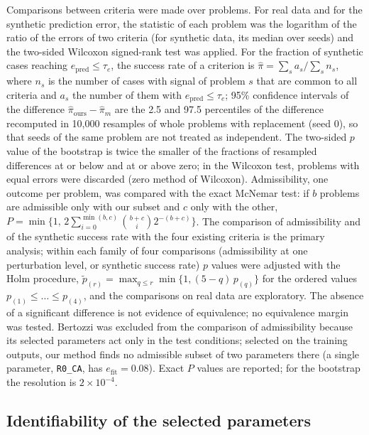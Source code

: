 \documentclass[pdflatex,sn-nature]{sn-jnl}
\theoremstyle{plain}
\begin{document}
Comparisons between criteria were made over problems. For real data and for the synthetic prediction error, the statistic of each problem was the logarithm of the ratio of the errors of two criteria (for synthetic data, its median over seeds) and the two-sided Wilcoxon signed-rank test was applied. For the fraction of synthetic cases reaching $e_{\mathrm{pred}}\le\tau_e$, the success rate of a criterion is $\hat\pi=\sum_s a_s/\sum_s n_s$, where $n_s$ is the number of cases with signal of problem $s$ that are common to all criteria and $a_s$ the number of them with $e_{\mathrm{pred}}\le\tau_e$; 95\% confidence intervals of the difference $\hat\pi_{\mathrm{ours}}-\hat\pi_m$ are the 2.5 and 97.5 percentiles of the difference recomputed in 10,000 resamples of whole problems with replacement (seed 0), so that seeds of the same problem are not treated as independent. The two-sided $p$ value of the bootstrap is twice the smaller of the fractions of resampled differences at or below and at or above zero; in the Wilcoxon test, problems with equal errors were discarded (zero method of Wilcoxon). Admissibility, one outcome per problem, was compared with the exact McNemar test: if $b$ problems are admissible only with our subset and $c$ only with the other, $P=\min\{1,\,2\sum_{i=0}^{\min(b,c)}\binom{b+c}{i}2^{-(b+c)}\}$. The comparison of admissibility and of the synthetic success rate with the four existing criteria is the primary analysis; within each family of four comparisons (admissibility at one perturbation level, or synthetic success rate) $p$ values were adjusted with the Holm procedure, $\tilde p_{(r)}=\max_{q\le r}\min\{1,(5-q)\,p_{(q)}\}$ for the ordered values $p_{(1)}\le\dots\le p_{(4)}$, and the comparisons on real data are exploratory. The absence of a significant difference is not evidence of equivalence; no equivalence margin was tested. Bertozzi was excluded from the comparison of admissibility because its selected parameters act only in the test conditions; selected on the training outputs, our method finds no admissible subset of two parameters there (a single parameter, \texttt{R0\_CA}, has $e_{\mathrm{fit}}=0.08$). Exact $P$ values are reported; for the bootstrap the resolution is $2\times10^{-4}$.

\subsection*{Identifiability of the selected parameters}\label{met:identif}
\end{document}
